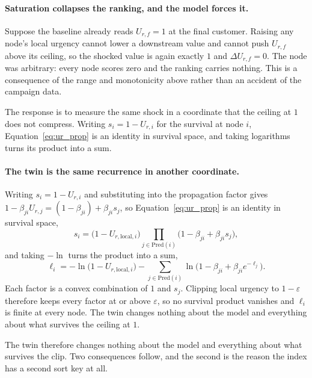 \paragraph{Saturation collapses the ranking, and the model forces it.}
\label{prop:saturation}
Suppose the baseline already reads $U_{r,f} = 1$ at the final customer. Raising any node's
local urgency cannot lower a downstream value and cannot push $U_{r,f}$ above its ceiling, so
the shocked value is again exactly $1$ and $\Delta U_{r,f} = 0$. The node was arbitrary:
every node scores zero and the ranking carries nothing. This is a consequence of the range
and monotonicity above rather than an accident of the campaign data.

The response is to measure the same shock in a coordinate that the ceiling at $1$ does not
compress. Writing $s_i = 1 - U_{r,i}$ for the survival at node $i$,
Equation~\ref{eq:ur_prop} is an identity in survival space, and taking logarithms turns its
product into a sum.

\paragraph{The twin is the same recurrence in another coordinate.}
\label{prop:logsurvival}
Writing $s_i = 1 - U_{r,i}$ and substituting into the propagation factor gives
$1 - \beta_{ji}U_{r,j} = (1-\beta_{ji}) + \beta_{ji}s_j$, so Equation~\ref{eq:ur_prop} is an
identity in survival space,
\begin{equation}
    s_i = \bigl(1 - U_{r,\text{local},i}\bigr)
          \prod_{j \in \mathrm{Pred}(i)} \bigl(1 - \beta_{ji} + \beta_{ji} s_j\bigr),
    \label{eq:survival}
\end{equation}
and taking $-\ln$ turns the product into a sum,
\begin{equation}
    \ell_i = -\ln\bigl(1 - U_{r,\text{local},i}\bigr)
             - \sum_{j \in \mathrm{Pred}(i)}
               \ln\bigl(1 - \beta_{ji} + \beta_{ji} e^{-\ell_j}\bigr).
    \label{eq:logsurvival}
\end{equation}
Each factor is a convex combination of $1$ and $s_j$. Clipping local urgency to
$1-\varepsilon$ therefore keeps every factor at or above $\varepsilon$, so no survival product
vanishes and $\ell_i$ is finite at every node. The twin changes nothing about the model and
everything about what survives the ceiling at $1$.

The twin therefore changes nothing about the model and everything about what survives the
clip. Two consequences follow, and the second is the reason the index has a second sort key
at all.

